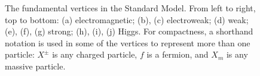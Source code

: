 \begin{figure}[htb]
    \qquad
    \qquad
    \caption[The fundamental vertices in the Standard Model]{
        The fundamental vertices in the Standard Model. 
        From left to right, top to bottom: 
        (a) electromagnetic; (b), (c) electroweak; (d) weak; (e), (f), (g) strong; (h), (i), (j) Higgs. 
        For compactness, a shorthand notation is used in some of the vertices to represent more than one particle: 
        $X^{\pm}$ is any charged particle, $f$ is a fermion, and $X_m$ is any massive particle. 
    }
    \label{fig:sm_vertices}
\end{figure}


